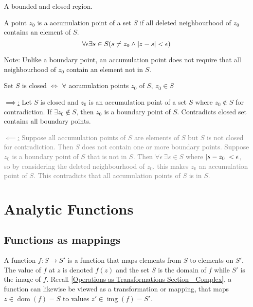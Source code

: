 \documentclass[12pt, english]{book}
\makeatletter
\renewenvironment{proof}[1][\proofname]{\par
	\pushQED{\qed}%
	\normalfont \topsep6\p@\@plus6\p@\relax
	\list{}{%
		\settowidth{\leftmargin}{\itshape\proofname:\hskip\labelsep}%
		\setlength{\labelwidth}{0pt}%
		\setlength{\itemindent}{-\leftmargin}%
	}%
	\item[\hskip\labelsep\itshape#1\@addpunct{:}]\ignorespaces
}{%
	\popQED\endlist\@endpefalse
}
\makeatother
\begin{document}
	\begin{definition}
		A bounded and closed region.
	\end{definition}

	\begin{definition}
		A point $z_0$ is a accumulation point of a set $S$ if all deleted neighbourhood of $z_0$ contains an element of $S$. 
		$$\forall \epsilon \exists s \in S (s \neq z_0 \land \abs{z-s} < \epsilon)$$
	\end{definition}
	Note: Unlike a boundary point, an accumulation point does not require that all neighbourhood of $z_0$ contain an element not in $S$.
	
	\begin{theorem}
		Set $S$ is closed $\iff$ $\forall$ accumulation points $z_0$ of $S$, $z_0 \in S$
	\end{theorem}
	\begin{proof}
		\underline{$\implies$:}
		Let $S$ is closed and $z_0$ is an accumulation point of a set $S$ where $z_0 \notin S$ for contradiction. If $\exists z_0 \notin S$, then $z_0$ is a boundary point of $S$. Contradicts closed set contains all boundary points. 
		
		\textcolor{Grey}{
		\underline{$\impliedby$:}
		Suppose all accumulation points of $S$ are elements of $S$ but $S$ is not closed for contradiction. Then $S$ does not contain one or more boundary points. Suppose $z_0$ is a boundary point of $S$ that is not in $S$. Then $\forall \epsilon \ \exists s\in S$ where $\abs{s-z_0} < \epsilon$, so by considering the deleted neighbourhood of $z_0$, this makes $z_0$ an accumulation point of $S$. This contradicts that all accumulation points of $S$ is in $S$. 		
		}
	\end{proof}

	\chapter{Analytic Functions} \label{Analytic Functions Chapter - Complex}
	\section{Functions as mappings} \label{Functions as Mappings Section - Complex}
	A function $f: S \rightarrow S'$ is a function that maps elements from $S$ to elements on $S'$. The value of $f$ at $z$ is denoted $f(z)$ and the set $S$ is the domain of $f$ while $S'$ is the image of $f$. Recall \cref{Operations as Transformations Section - Complex}, a function can likewise be viewed as a transformation or mapping, that maps $z \in \operatorname{dom}(f) = S$ to values $z' \in \operatorname{img}(f) = S'$.
	
\end{document}
